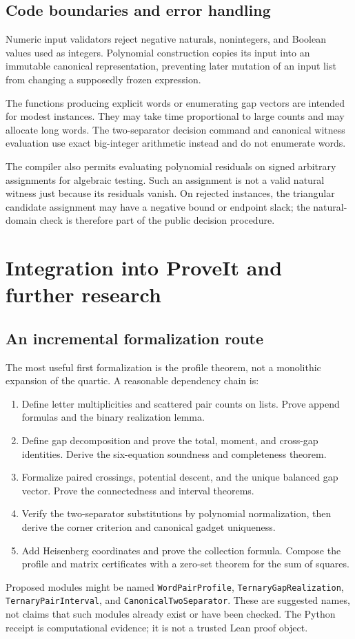 \documentclass[11pt,letterpaper]{article}
\theoremstyle{definition}
\theoremstyle{remark}
\newcommand{\code}[1]{\nolinkurl{#1}}
\begin{document}
\subsection{Code boundaries and error handling}
Numeric input validators reject negative naturals, nonintegers, and Boolean values used as integers. Polynomial construction copies its input into an immutable canonical representation, preventing later mutation of an input list from changing a supposedly frozen expression.

The functions producing explicit words or enumerating gap vectors are intended for modest instances. They may take time proportional to large counts and may allocate long words. The two-separator decision command and canonical witness evaluation use exact big-integer arithmetic instead and do not enumerate words.

The compiler also permits evaluating polynomial residuals on signed arbitrary assignments for algebraic testing. Such an assignment is not a valid natural witness just because its residuals vanish. On rejected instances, the triangular candidate assignment may have a negative bound or endpoint slack; the natural-domain check is therefore part of the public decision procedure.

\section{Integration into ProveIt and further research}
\subsection{An incremental formalization route}
The most useful first formalization is the profile theorem, not a monolithic expansion of the quartic. A reasonable dependency chain is:
\begin{enumerate}[label=\arabic*.]
\item Define letter multiplicities and scattered pair counts on lists. Prove append formulas and the binary realization lemma.
\item Define gap decomposition and prove the total, moment, and cross-gap identities. Derive the six-equation soundness and completeness theorem.
\item Formalize paired crossings, potential descent, and the unique balanced gap vector. Prove the connectedness and interval theorems.
\item Verify the two-separator substitutions by polynomial normalization, then derive the corner criterion and canonical gadget uniqueness.
\item Add Heisenberg coordinates and prove the collection formula. Compose the profile and matrix certificates with a zero-set theorem for the sum of squares.
\end{enumerate}
Proposed modules might be named \code{WordPairProfile}, \code{TernaryGapRealization}, \code{TernaryPairInterval}, and \code{CanonicalTwoSeparator}. These are suggested names, not claims that such modules already exist or have been checked. The Python receipt is computational evidence; it is not a trusted Lean proof object.
\end{document}
